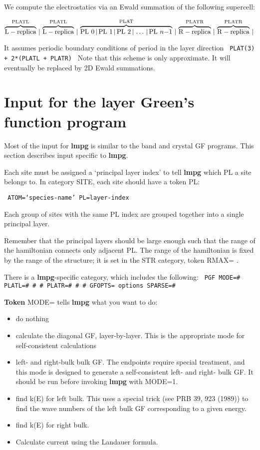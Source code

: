 \documentclass{article}
\def\itemiia{\addtocounter{enumii}{1}\item[\arabic{enumii}]}
\begin{document}
We compute the electrostatics via an Ewald summation of the
following supercell:

\[
 \overbrace{\rm L-replica}^{\rm PLATL}\,|\,
 \overbrace{\rm L-replica}^{\rm PLATL}\,|\,
 \overbrace{{\rm PL}\ 0 \,|\, {\rm PL}\ 1 \,|\, {\rm PL}\ 2 \,|\,  \ldots \,|\, {\rm PL}\ n{\rm{-}}1}^{\rm PLAT}\,|\,
 \overbrace{\rm R-replica}^{\rm PLATR}\,|\,
 \overbrace{\rm R-replica}^{\rm PLATR}\,|\,
\]

It assumes periodic boundary conditions of period in the layer direction
{\tt
\vskip 6pt
   PLAT(3) + 2*(PLATL + PLATR)
\vskip 6pt
}
\noindent
Note that this scheme is only approximate.  It will eventually be
replaced by 2D Ewald summations.

\section{Input for the layer Green's function program}
\label{sec:input}

Most of the input for {\bf lmpg} is similar to the band and crystal GF
programs.  This section describes input specific to {\bf lmpg}.

\vskip 12pt

\noindent
Each site must be assigned a `principal layer index' to tell {\bf lmpg}
which PL a site belongs to.  In category SITE, each site should
have a token PL:

{\tt
\vskip 6pt
  ATOM=`species-name'   PL=layer-index
\vskip 6pt
}

\noindent
Each group of sites with the same PL index are grouped together
into a single principal layer.

\noindent
Remember that the principal layers should be large enough such
that the range of the hamiltonian connects only adjacent PL.  The
range of the hamiltonian is fixed by the range of the structure;
it is set in the STR category, token RMAX= .

\noindent
There is a {\bf lmpg}-specific category, which includes the following:
{\tt
\vskip 6pt
   PGF    MODE=\#  PLATL=\# \# \#  PLATR=\# \# \#   GFOPTS= options   SPARSE=\#
\vskip 6pt
}

\noindent
{\bf Token} MODE= tells {\bf lmpg} what you want to do:

\begin{itemize}
\setcounter{enumii}{-1}
  \itemiia do nothing

  \itemiia calculate the diagonal GF, layer-by-layer.
	   This is the appropriate mode for self-consistent calculations

  \itemiia left- and right-bulk bulk GF.  The endpoints require
	   special treatment, and this mode is designed to generate
	   a self-consistent left- and right- bulk GF.   It should
	   be run before invoking {\bf lmpg} with MODE=1.


  \itemiia find k(E) for left bulk.  This uses a special trick
	   (see PRB 39, 923 (1989)) to find the wave numbers of
	   the left bulk GF corresponding to a given energy.

  \itemiia find k(E) for right bulk.

  \itemiia Calculate current using the Landauer formula.
\end{itemize}
\end{document}
